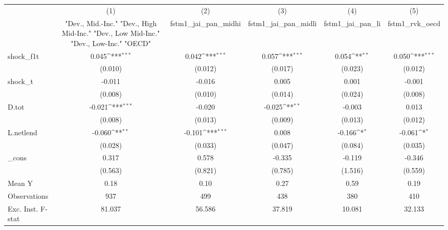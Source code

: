 {
\def\sym#1{\ifmmode^{#1}\else\(^{#1}\)\fi}
\begin{tabular}{l*{5}{c}}
\toprule
            &\multicolumn{1}{c}{(1)}&\multicolumn{1}{c}{(2)}&\multicolumn{1}{c}{(3)}&\multicolumn{1}{c}{(4)}&\multicolumn{1}{c}{(5)}\\
            &\multicolumn{1}{c}{ "Dev., Mid.-Inc." "Dev., High Mid-Inc." "Dev., Low Mid-Inc." "Dev., Low-Inc." "OECD" }&\multicolumn{1}{c}{fstm1\_jai\_pan\_midhi}&\multicolumn{1}{c}{fstm1\_jai\_pan\_midli}&\multicolumn{1}{c}{fstm1\_jai\_pan\_li}&\multicolumn{1}{c}{fstm1\_rvk\_oecd}\\
\midrule
shock\_f1t   &       0.045\sym{***}&       0.042\sym{***}&       0.057\sym{***}&       0.054\sym{**} &       0.050\sym{***}\\
            &     (0.010)         &     (0.012)         &     (0.017)         &     (0.023)         &     (0.012)         \\
\addlinespace
shock\_t     &      -0.011         &      -0.016         &       0.005         &       0.001         &      -0.001         \\
            &     (0.008)         &     (0.010)         &     (0.014)         &     (0.024)         &     (0.008)         \\
\addlinespace
D.tot       &      -0.021\sym{***}&      -0.020         &      -0.025\sym{**} &      -0.003         &       0.013         \\
            &     (0.008)         &     (0.013)         &     (0.009)         &     (0.013)         &     (0.012)         \\
\addlinespace
L.netlend   &      -0.060\sym{**} &      -0.101\sym{***}&       0.008         &      -0.166\sym{*}  &      -0.061\sym{*}  \\
            &     (0.028)         &     (0.033)         &     (0.047)         &     (0.084)         &     (0.035)         \\
\addlinespace
\_cons      &       0.317         &       0.578         &      -0.335         &      -0.119         &      -0.346         \\
            &     (0.563)         &     (0.821)         &     (0.785)         &     (1.516)         &     (0.559)         \\
\midrule
Mean Y      &        0.18         &        0.10         &        0.27         &        0.59         &        0.19         \\
Observations&         937         &         499         &         438         &         380         &         410         \\
Exc. Inst. F-stat&      81.037         &      56.586         &      37.819         &      10.081         &      32.133         \\
\bottomrule
\end{tabular}
}

